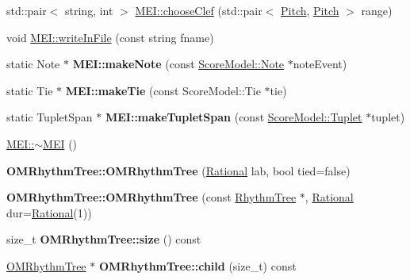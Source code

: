\begin{DoxyCompactItemize}
\item 
std\+::pair$<$ string, int $>$ \mbox{\hyperlink{group__output_ga707656b4b214953f8be23c95415a8ed5}{M\+E\+I\+::choose\+Clef}} (std\+::pair$<$ \mbox{\hyperlink{classPitch}{Pitch}}, \mbox{\hyperlink{classPitch}{Pitch}} $>$ range)
\item 
void \mbox{\hyperlink{group__output_ga7f0c47ab091313feb0a7fba4d23e09da}{M\+E\+I\+::write\+In\+File}} (const string fname)
\item 
\mbox{\label{group__output_ga6c05e4fec7d79e79d9022130e8fef2ad}} 
static Note $\ast$ {\bfseries M\+E\+I\+::make\+Note} (const \mbox{\hyperlink{classScoreModel_1_1Note}{Score\+Model\+::\+Note}} $\ast$note\+Event)
\item 
\mbox{\label{group__output_gafa5b4ccd58b7537120b30437c8072852}} 
static Tie $\ast$ {\bfseries M\+E\+I\+::make\+Tie} (const Score\+Model\+::\+Tie $\ast$tie)
\item 
\mbox{\label{group__output_gabbdc2a86af7313ccc63b1b502d9b0aa5}} 
static Tuplet\+Span $\ast$ {\bfseries M\+E\+I\+::make\+Tuplet\+Span} (const \mbox{\hyperlink{classScoreModel_1_1Tuplet}{Score\+Model\+::\+Tuplet}} $\ast$tuplet)
\item 
\mbox{\hyperlink{group__output_ga1e4233e0a65d642f227dba08be1fe592}{M\+E\+I\+::$\sim$\+M\+EI}} ()
\item 
\mbox{\label{group__output_gac708fcabf8489ca08a9f7231eeb928d0}} 
{\bfseries O\+M\+Rhythm\+Tree\+::\+O\+M\+Rhythm\+Tree} (\mbox{\hyperlink{classRational}{Rational}} lab, bool tied=false)
\item 
\mbox{\label{group__output_ga1dae8e3f43573cc3aac4859b5b618ef3}} 
{\bfseries O\+M\+Rhythm\+Tree\+::\+O\+M\+Rhythm\+Tree} (const \mbox{\hyperlink{classRhythmTree}{Rhythm\+Tree}} $\ast$, \mbox{\hyperlink{classRational}{Rational}} dur=\mbox{\hyperlink{classRational}{Rational}}(1))
\item 
\mbox{\label{group__output_ga5877122dcb737ec9bdbe94241b867b4e}} 
size\+\_\+t {\bfseries O\+M\+Rhythm\+Tree\+::size} () const
\item 
\mbox{\label{group__output_ga59d59642fc58d66772d51a075720a701}} 
\mbox{\hyperlink{classOMRhythmTree}{O\+M\+Rhythm\+Tree}} $\ast$ {\bfseries O\+M\+Rhythm\+Tree\+::child} (size\+\_\+t) const

\end{DoxyCompactItemize}
